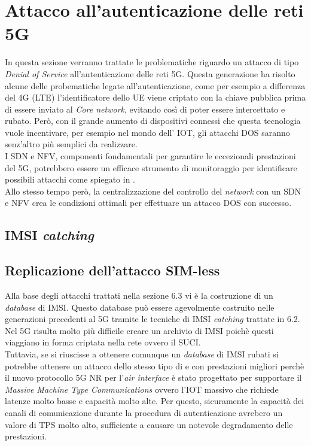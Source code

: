 \section{Attacco all'autenticazione delle reti 5G}
In questa sezione verranno trattate le problematiche riguardo un attacco di tipo \textit{Denial of Service} all'autenticazione delle reti 5G.
Questa generazione ha risolto alcune delle probematiche legate all'autenticazione, come per esempio a differenza del 4G (LTE) l'identificatore 
dello UE viene criptato con la chiave pubblica prima di essere inviato al \textit{Core network}, evitando così di poter essere intercettato e rubato\cite{5g-vs-4g}.
Però, con il grande aumento di dispositivi connessi che questa tecnologia vuole incentivare, per esempio nel mondo dell' IOT, gli attacchi DOS saranno senz'altro più 
semplici da realizzare.\\
I SDN e NFV, componenti fondamentali per garantire le eccezionali prestazioni del 5G, potrebbero essere un efficace strumento di monitoraggio per identificare possibili 
attacchi come spiegato in \cite{dos-detection-with-sdn}.\\
Allo stesso tempo però, la centralizzazione del controllo del \textit{network} con un SDN e NFV crea le condizioni ottimali per effettuare un attacco DOS con successo\cite{5g-dos}.

\subsection{IMSI \textit{catching}}
\cite{suci-catch}

\subsection{Replicazione dell'attacco SIM-less}
Alla base degli attacchi trattati nella sezione 6.3 vi è la costruzione di un \textit{database} di IMSI. Questo database può essere agevolmente costruito nelle generazioni precedenti al 5G 
tramite le tecniche di IMSI \textit{catching} trattate in 6.2. Nel 5G risulta molto più difficile creare un archivio di IMSI poichè questi viaggiano in forma criptata nella rete ovvero il SUCI.\\
Tuttavia, se si riuscisse a ottenere comunque un \textit{database} di IMSI rubati si potrebbe ottenere un attacco dello stesso tipo di \cite{gsm-dos-simless} e \cite{umts-dos} con prestazioni migliori 
perchè il nuovo protocollo 5G NR\cite{5g-nr} per l'\textit{air interface} è stato progettato per supportare il \textit{Massive Machine Type Communications} ovvero l'IOT massivo che richiede latenze molto basse e capacità molto alte.
Per questo, sicuramente la capacità dei canali di comunicazione durante la procedura di autenticazione avrebero un valore di TPS molto alto, sufficiente a causare un notevole degradamento delle prestazioni.

